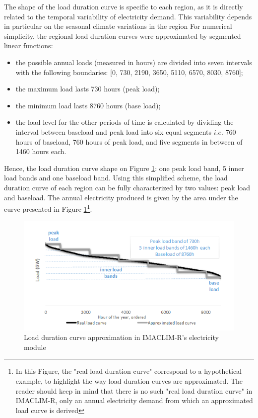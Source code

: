 The shape of the load duration curve is specific to each region, as it is directly related to the temporal variability of electricity demand. This variability depends in particular on the seasonal climate variations in the region
For numerical simplicity, the regional load duration curves were approximated by segmented linear functions:
\begin{itemize}
    \item the possible annual loads (measured in hours) are divided into seven intervals with the following boundaries: [0, 730, 2190, 3650, 5110, 6570, 8030, 8760];
    \item the maximum load lasts 730 hours (peak load);
    \item the minimum load lasts 8760 hours (base load);
    \item the load level for the other periods of time is calculated by dividing the interval between baseload and peak load into six equal segments $i.e.$ 760 hours of baseload, 760 hours of peak load, and five segments in between of 1460 hours each.
\end{itemize}

Hence, the load duration curve shape on Figure \ref{fig:LDC}: one peak load band, 5 inner load bands and one baseload band.
Using this simplified scheme, the load duration curve of each region can be fully characterized by two values: peak load and baseload. The annual electricity produced is given by the area under the curve presented in Figure \ref{fig:LDC}\footnote{In this Figure, the "real load duration curve" correspond to a hypothetical example, to highlight the way load duration curves are approximated. The reader should keep in mind that there is no such "real load duration curve" in IMACLIM-R, only an annual electricity demand from which an approximated load curve is derived}.

\begin{figure}
    \includegraphics{figures&tables/LDC.png}
    \caption{Load duration curve approximation in IMACLIM-R's electricity module}
    \centering
    \label{fig:LDC}
\end{figure}


